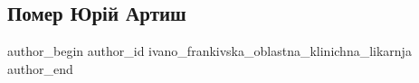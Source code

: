  
 
 
 
 
 
\subsection{Помер Юрій Артиш}
\label{sec:23_11_2020.fb.ivano_frankivska_oblastna_klinichna_likarnja.1.jurij_artysh}
\ifcmt
	author_begin
   author_id ivano_frankivska_oblastna_klinichna_likarnja
	author_end
\fi
